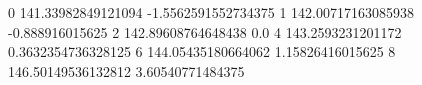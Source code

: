 0 141.33982849121094 -1.5562591552734375
1 142.00717163085938 -0.888916015625
2 142.89608764648438 0.0
4 143.2593231201172 0.3632354736328125
6 144.05435180664062 1.15826416015625
8 146.50149536132812 3.60540771484375
